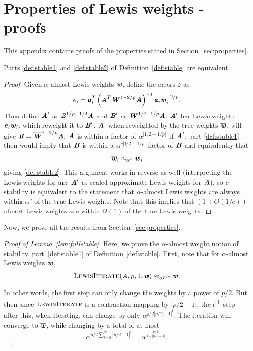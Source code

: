 
\section{Properties of Lewis weights - proofs}
\label{sec:properties-proofs}
This appendix contains proofs of the properties stated in Section~\ref{sec:properties}.

\begin{lemma}
\label{lem:equivstable}
Parts \ref{def:stable1} and \ref{def:stable2} of Definition~\ref{def:stable} are equivalent.
\end{lemma}
\begin{proof}
Given $\alpha$-almost Lewis weights $\ww$, define the errors $\ee$ as
\begin{equation*}
\ee_i = \aa_i^T \left( \AA^T \WW^{1 - 2/p} \AA \right)^{-1} \aa_i \ww_i^{-2/p}.
\end{equation*}
Then define $\AA'$ as $\EE^{1/p-1/2} \AA$ and $\BB'$ as $\WW^{1/2-1/p} \AA$. $\AA'$ has
Lewis weights $\ee_i \ww_i$, which reweight it to $\BB'$.  $\AA$,
when reweighted by the true weights $\wwbar$, will give $\BB = \WWbar^{1-2/p} \AA$.
$\AA$ is within a factor of $\alpha^{|1/2-1/p|}$ of $\AA'$; part \ref{def:stable1} then would imply
that $\BB$ is within a $\alpha^{c |1/2-1/p|}$ factor of $\BB$ and equivalently that
\begin{equation*}
\wwbar_i \approx_{\alpha^c} \ww_i
\end{equation*}
giving \ref{def:stable2}.
This argument works in reverse as well (interpreting the Lewis weights for any $\AA'$ as scaled
approximate Lewis weights for $\AA$), so $c$-stability is equivalent to the statement that
$\alpha$-almost Lewis weights are always within $\alpha^c$ of the true Lewis weights.  Note
that this implies that $(1+O(1/c))$-almost Lewis weights are within $O(1)$ of the true Lewis
weights.
\end{proof}

Now, we prove all the results from Section~\ref{sec:properties}.
\begin{proof}[Proof of Lemma~\ref{lem:fullstable}]
Here, we prove the $\alpha$-almost weight notion of stability, part~\ref{def:stable1} of Definition~\ref{def:stable}.
First, note that for $\alpha$-almost Lewis weights $\ww$,
\begin{equation*}
\textsc{LewisIterate}(\AA, p, 1, \ww) \approx_{\alpha^{p/2}} \ww.
\end{equation*}

In other words, the first step can only change the weights by a power of $p/2$.
But then since $\textsc{LewisIterate}$ is a contraction mapping by $|p/2 - 1|$,
the $t$\textsuperscript{th} step after this, when iterating, can change by only $\alpha^{p/2 |p/2 - 1|^t}$.
The iteration will converge to $\wwbar$, while changing by a total of at most
\begin{equation*}
\alpha^{p/2 \sum_{t=0}^\infty |p/2 - 1|^t} = \alpha^{\frac{p/2}{1 - |p/2 - 1|}}.
\end{equation*}
\end{proof}


